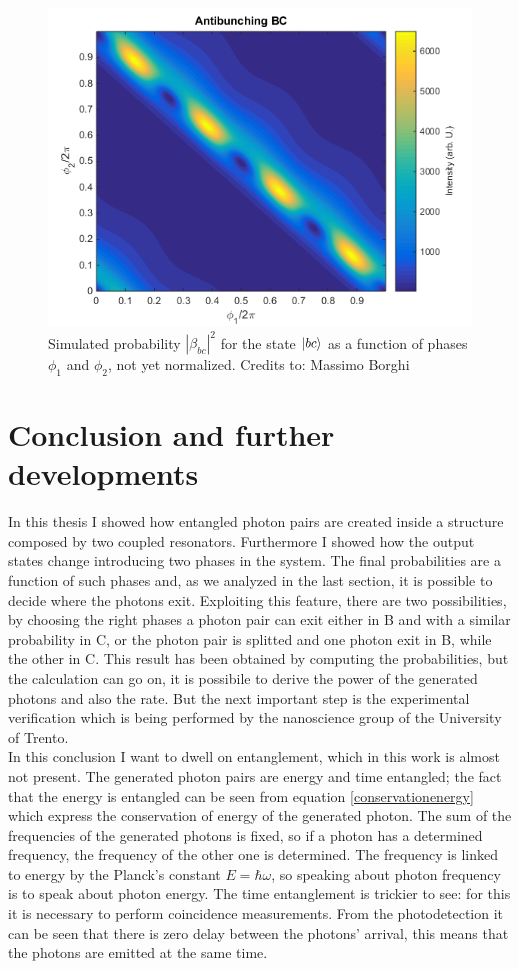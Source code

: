 \begin{figure}
\centering
\includegraphics[width = .8\textwidth]{img/Antibunching_BC}
\caption{Simulated probability $|\beta_{bc}|^2$ for the state $\ket{bc}$ as a function of phases $\phi_1$ and $\phi_2$, not yet normalized. Credits to: Massimo Borghi}\label{antibounchstate}
\end{figure}

\chapter{Conclusion and further developments}
In this thesis I showed how entangled photon pairs are created inside a structure composed by two coupled resonators. Furthermore I showed how the output states change introducing two phases in the system. The final probabilities are a function of such phases and, as we analyzed in the last section, it is possible to decide where the photons exit. Exploiting this feature, there are two possibilities, by choosing the right phases a photon pair can exit either in B and with a similar probability in C, or the photon pair is splitted and one photon exit in B, while the other in C. This result has been obtained by computing the probabilities, but the calculation can go on, it is possibile to derive the power of the generated photons and also the rate. But the next important step is the experimental verification which is being performed by the nanoscience group of the University of Trento.\\
In this conclusion I want to dwell on entanglement, which in this work is almost not present. The generated photon pairs are energy and time entangled; the fact that the energy is entangled can be seen from equation \eqref{conservationenergy} which express the conservation of energy of the generated photon. The sum of the frequencies of the generated photons is fixed, so if a photon has a determined frequency, the frequency of the other one is determined. The frequency is linked to energy by the Planck's constant $E = \hbar \omega$, so speaking about photon frequency is to speak about photon energy. The time entanglement is trickier to see: for this it is necessary to perform coincidence measurements. From the photodetection it can be seen that there is zero delay between the photons' arrival, this means that the photons are emitted at the same time.